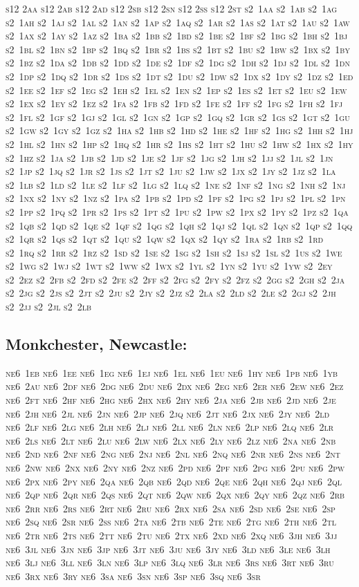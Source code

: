 \documentclass[12pt,a4paper]{article}
\begin{document}
\textsc{\lowercase{%
S12 2AA	S12 2AB	S12 2AD	S12 2SB	S12 2SN	S12 2SS
S12 2ST	S2~1AA	S2~1AB	S2~1AG	S2~1AH	S2~1AJ
S2~1AL	S2~1AN	S2~1AP	S2~1AQ	S2~1AR	S2~1AS
S2~1AT	S2~1AU	S2~1AW	S2~1AX	S2~1AY	S2~1AZ
S2~1BA	S2~1BB	S2~1BD	S2~1BE	S2~1BF	S2~1BG
S2~1BH	S2~1BJ	S2~1BL	S2~1BN	S2~1BP	S2~1BQ
S2~1BR	S2~1BS	S2~1BT	S2~1BU	S2~1BW	S2~1BX
S2~1BY	S2~1BZ	S2~1DA	S2~1DB	S2~1DD	S2~1DE
S2~1DF	S2~1DG	S2~1DH	S2~1DJ	S2~1DL	S2~1DN
S2~1DP	S2~1DQ	S2~1DR	S2~1DS	S2~1DT	S2~1DU
S2~1DW	S2~1DX	S2~1DY	S2~1DZ	S2~1ED	S2~1EE
S2~1EF	S2~1EG	S2~1EH	S2~1EL	S2~1EN	S2~1EP
S2~1ES	S2~1ET	S2~1EU	S2~1EW	S2~1EX	S2~1EY
S2~1EZ	S2~1FA	S2~1FB	S2~1FD	S2~1FE	S2~1FF
S2~1FG	S2~1FH	S2~1FJ	S2~1FL	S2~1GF	S2~1GJ
S2~1GL	S2~1GN	S2~1GP	S2~1GQ	S2~1GR	S2~1GS
S2~1GT	S2~1GU	S2~1GW	S2~1GY	S2~1GZ	S2~1HA
S2~1HB	S2~1HD	S2~1HE	S2~1HF	S2~1HG	S2~1HH
S2~1HJ	S2~1HL	S2~1HN	S2~1HP	S2~1HQ	S2~1HR
S2~1HS	S2~1HT	S2~1HU	S2~1HW	S2~1HX	S2~1HY
S2~1HZ	S2~1JA	S2~1JB	S2~1JD	S2~1JE	S2~1JF
S2~1JG	S2~1JH	S2~1JJ	S2~1JL	S2~1JN	S2~1JP
S2~1JQ	S2~1JR	S2~1JS	S2~1JT	S2~1JU	S2~1JW
S2~1JX	S2~1JY	S2~1JZ	S2~1LA	S2~1LB	S2~1LD
S2~1LE	S2~1LF	S2~1LG	S2~1LQ	S2~1NE	S2~1NF
S2~1NG	S2~1NH	S2~1NJ	S2~1NX	S2~1NY	S2~1NZ
S2~1PA	S2~1PB	S2~1PD	S2~1PF	S2~1PG	S2~1PJ
S2~1PL	S2~1PN	S2~1PP	S2~1PQ	S2~1PR	S2~1PS
S2~1PT	S2~1PU	S2~1PW	S2~1PX	S2~1PY	S2~1PZ
S2~1QA	S2~1QB	S2~1QD	S2~1QE	S2~1QF	S2~1QG
S2~1QH	S2~1QJ	S2~1QL	S2~1QN	S2~1QP	S2~1QQ
S2~1QR	S2~1QS	S2~1QT	S2~1QU	S2~1QW	S2~1QX
S2~1QY	S2~1RA	S2~1RB	S2~1RD	S2~1RQ	S2~1RR
S2~1RZ	S2~1SD	S2~1SE	S2~1SG	S2~1SH	S2~1SJ
S2~1SL	S2~1US	S2~1WE	S2~1WG	S2~1WJ	S2~1WT
S2~1WW	S2~1WX	S2~1YL	S2~1YN	S2~1YU	S2~1YW
S2~2EY	S2~2EZ	S2~2FB	S2~2FD	S2~2FE	S2~2FF
S2~2FG	S2~2FY	S2~2FZ	S2~2GG	S2~2GH	S2~2JA
S2~2JG	S2~2JS	S2~2JT	S2~2JU	S2~2JY	S2~2JZ
S2~2LA	S2~2LD	S2~2LE	S2~2GJ	S2~2JH	S2~2JJ
S2~2JL	S2~2LB				
}}

\subsection*{Monkchester, Newcastle:}

\textsc{\lowercase{%
NE6~1EB	NE6~1EE	NE6~1EG	NE6~1EJ	NE6~1EL	NE6~1EU
NE6~1HY	NE6~1PB	NE6~1YB	NE6~2AU	NE6~2DF	NE6~2DG
NE6~2DU	NE6~2DX	NE6~2EG	NE6~2ER	NE6~2EW	NE6~2EZ
NE6~2FT	NE6~2HF	NE6~2HG	NE6~2HX	NE6~2HY	NE6~2JA
NE6~2JB	NE6~2JD	NE6~2JE	NE6~2JH	NE6~2JL	NE6~2JN
NE6~2JP	NE6~2JQ	NE6~2JT	NE6~2JX	NE6~2JY	NE6~2LD
NE6~2LF	NE6~2LG	NE6~2LH	NE6~2LJ	NE6~2LL	NE6~2LN
NE6~2LP	NE6~2LQ	NE6~2LR	NE6~2LS	NE6~2LT	NE6~2LU
NE6~2LW	NE6~2LX	NE6~2LY	NE6~2LZ	NE6~2NA	NE6~2NB
NE6~2ND	NE6~2NF	NE6~2NG	NE6~2NJ	NE6~2NL	NE6~2NQ
NE6~2NR	NE6~2NS	NE6~2NT	NE6~2NW	NE6~2NX	NE6~2NY
NE6~2NZ	NE6~2PD	NE6~2PF	NE6~2PG	NE6~2PU	NE6~2PW
NE6~2PX	NE6~2PY	NE6~2QA	NE6~2QB	NE6~2QD	NE6~2QE
NE6~2QH	NE6~2QJ	NE6~2QL	NE6~2QP	NE6~2QR	NE6~2QS
NE6~2QT	NE6~2QW	NE6~2QX	NE6~2QY	NE6~2QZ	NE6~2RB
NE6~2RR	NE6~2RS	NE6~2RT	NE6~2RU	NE6~2RX	NE6~2SA
NE6~2SD	NE6~2SE	NE6~2SP	NE6~2SQ	NE6~2SR	NE6~2SS
NE6~2TA	NE6~2TB	NE6~2TE	NE6~2TG	NE6~2TH	NE6~2TL
NE6~2TR	NE6~2TS	NE6~2TT	NE6~2TU	NE6~2TX	NE6~2XD
NE6~2XQ	NE6~3JH	NE6~3JJ	NE6~3JL	NE6~3JN	NE6~3JP
NE6~3JT	NE6~3JU	NE6~3JY	NE6~3LD	NE6~3LE	NE6~3LH
NE6~3LJ	NE6~3LL	NE6~3LN	NE6~3LP	NE6~3LQ	NE6~3LR
NE6~3RS	NE6~3RT	NE6~3RU	NE6~3RX	NE6~3RY	NE6~3SA
NE6~3SN	NE6~3SP	NE6~3SQ	NE6~3SR		
}}
\end{document}
